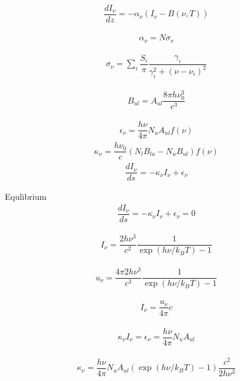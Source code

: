 \begin{align}
	\dfrac{d I_{\nu}}{dz} = -\alpha_{\nu}	 (I_{\nu} - B(\nu, T))
\end{align}

\begin{align}
	\alpha_{\nu} = N \sigma_{\nu}
\end{align}

\begin{align}
	\sigma_{\nu} = \sum_i \dfrac{S_i}{\pi} \dfrac{\gamma_i}{\gamma_i^2 + (\nu - \nu_i)^2}
\end{align}


\begin{align}
	B_{ul} = A_{ul} \dfrac{8 \pi h \nu_0^3}{c^3	}
\end{align}

\begin{align}
	\epsilon_{\nu} = \dfrac{h \nu}{4 \pi} N_u A_{ul} f(\nu)
\end{align}
\begin{align}
	\kappa_{\nu} = \dfrac{h \nu_0}{c} (N_l B_{lu} - N_u B_{ul}) f(\nu)
\end{align}
\begin{align}
	\dfrac{d I_{\nu}}{ds} = - \kappa_{\nu} I_{\nu} + \epsilon_{\nu}
\end{align}

Equlibrium
\begin{align}
	\dfrac{d I_{\nu}}{ds} = - \kappa_{\nu} I_{\nu} + \epsilon_{\nu} = 0
\end{align}

\begin{align}
	I_{\nu} = \dfrac{2 h \nu^3}{c^2}  \dfrac{1}{\exp(h \nu /  k_B T) - 1}
\end{align}

\begin{align}
	u_{\nu} = \dfrac{4 \pi 2 h \nu^3}{c^3}  \dfrac{1}{\exp(h \nu /  k_B T) - 1}
\end{align}

\begin{align}
	I_{\nu} = \dfrac{u_{\nu}}{4 \pi} c
\end{align}

\begin{align}
	\kappa_{\nu} I_{\nu} = \epsilon_{\nu} = \dfrac{h \nu}{4 \pi} N_u A_{ul}
\end{align}

\begin{align}
	\kappa_{\nu} = \dfrac{h \nu}{4 \pi} N_u A_{ul} (\exp(h \nu /  k_B T) - 1) \dfrac{c^2}{2 h \nu^3}
\end{align}


